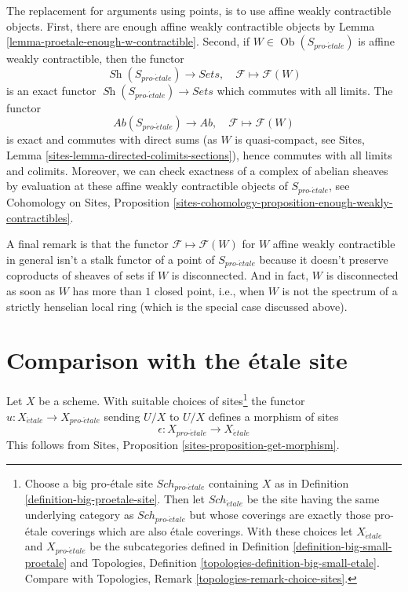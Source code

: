 \documentclass{stacks-project}
\theoremstyle{plain}
\theoremstyle{definition}
\theoremstyle{remark}
\numberwithin{equation}{subsection}
\def\Sch{\mathit{Sch}}
\def\Ob{\mathop{\mathrm{Ob}}\nolimits}
\def\Sh{\mathop{\mathit{Sh}}\nolimits}
\def\proetale{{pro\text{-}\acute{e}tale}}
\def\etale{{\acute{e}tale}}
\begin{document}
\medskip\noindent
The replacement for arguments using points, is to use affine
weakly contractible objects.
First, there are enough affine weakly contractible objects by
Lemma \ref{lemma-proetale-enough-w-contractible}.
Second, if $W \in \Ob(S_\proetale)$ is affine weakly contractible,
then the functor
$$
\Sh(S_\proetale) \longrightarrow \textit{Sets},\quad
\mathcal{F} \longmapsto \mathcal{F}(W)
$$
is an exact functor $\Sh(S_\proetale) \to \textit{Sets}$ which commutes
with all limits. The functor
$$
\textit{Ab}(S_\proetale) \longrightarrow \textit{Ab},\quad
\mathcal{F} \longmapsto \mathcal{F}(W)
$$
is exact and commutes with direct sums (as $W$ is quasi-compact, see
Sites, Lemma \ref{sites-lemma-directed-colimits-sections}), hence
commutes with all limits and colimits. Moreover, we can check exactness of
a complex of abelian sheaves by evaluation at these affine
weakly contractible objects of $S_\proetale$, see
Cohomology on Sites, Proposition
\ref{sites-cohomology-proposition-enough-weakly-contractibles}.

\medskip\noindent
A final remark is that the functor $\mathcal{F} \mapsto \mathcal{F}(W)$
for $W$ affine weakly contractible in general isn't a stalk functor of a
point of $S_\proetale$ because it doesn't preserve coproducts of sheaves of
sets if $W$ is disconnected. And in fact, $W$ is disconnected as soon as $W$
has more than $1$ closed point, i.e., when $W$ is not the spectrum of a
strictly henselian local ring (which is the special case discussed above).





\section{Comparison with the \'etale site}
\label{section-comparison}

\noindent
Let $X$ be a scheme. With suitable choices of sites\footnote{Choose
a big pro-\'etale site $\Sch_\proetale$ containing $X$ as in
Definition \ref{definition-big-proetale-site}. Then let $\Sch_\etale$
be the site having the same underlying category as $\Sch_\proetale$ but
whose coverings are exactly those pro-\'etale coverings which are also
\'etale coverings. With these choices let $X_\etale$ and $X_\proetale$
be the subcategories defined in
Definition \ref{definition-big-small-proetale} and
Topologies, Definition \ref{topologies-definition-big-small-etale}.
Compare with
Topologies, Remark \ref{topologies-remark-choice-sites}.}
the functor $u : X_\etale \to X_\proetale$ sending
$U/X$ to $U/X$ defines a morphism of sites
$$
\epsilon : X_\proetale \longrightarrow X_\etale
$$
This follows from Sites, Proposition \ref{sites-proposition-get-morphism}.
\end{document}
